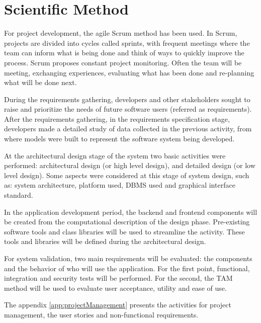\section{Scientific Method}\label{sec:method}

For project development, the agile Scrum method has been used. In Scrum, projects are divided into cycles called sprints, with frequent meetings where the team can inform what is being done and think of ways to quickly improve the process. Scrum proposes constant project monitoring. Often the team will be meeting, exchanging experiences, evaluating what has been done and re-planning what will be done next.

During the requirements gathering, developers and other stakeholders sought to raise and prioritize the needs of future software users (referred as requirements). After the requirements gathering, in the requirements specification stage, developers made a detailed study of data collected in the previous activity, from where models were built to represent the software system being developed.

At the architectural design stage of the system two basic activities were performed: architectural design (or high level design), and detailed design (or low level design). Some aspects were considered at this stage of system design, such as: system architecture, platform used,  \ac{DBMS} used and graphical interface standard.

In the application development period, the backend and frontend components will be created from the computational description of the design phase. Pre-existing software tools and class libraries will be used to streamline the activity. These tools and libraries will be defined during the architectural design.

For system validation, two main requirements will be evaluated: the components and the behavior of who will use the application. For the first point, functional, integration and security tests will be performed. For the second, the \acf{TAM} method will be used to evaluate user acceptance, utility and ease of use.

The appendix \ref{app:projectManagement} presents the activities for project management, the user stories and non-functional requirements.